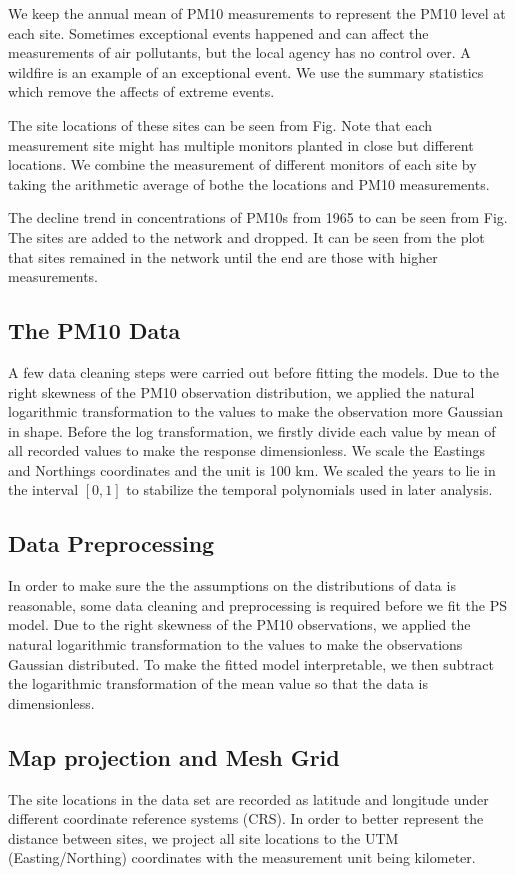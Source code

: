 We keep the annual mean of PM10 measurements to represent the PM10 level at each site.
Sometimes exceptional events happened and can affect the measurements of air pollutants, 
but the local agency has no control over. A wildfire is an example of an exceptional event. 
We use the summary statistics which remove the affects of extreme events.  

The site locations of these sites can be seen from Fig. Note that each measurement site might has 
multiple monitors planted in close but different locations. We combine the measurement of different
monitors of each site by taking the arithmetic average of bothe the locations and PM10 measurements.

The decline trend in concentrations of PM10s from 1965 to can be seen from Fig. The sites are added 
to the network and dropped. It can be seen from the plot that sites remained in the network until 
the end are those with higher measurements.
\subsection{The PM10 Data}
A few data cleaning steps were carried out before fitting the models. Due to the right skewness of 
the PM10 observation distribution, we applied the natural logarithmic transformation to the values
to make the observation more Gaussian in shape. Before the log transformation, we firstly divide
each value by mean of all recorded values to make the response dimensionless.
We scale the Eastings and Northings coordinates and the unit is 100 km. We scaled the years to
lie in the interval $[0, 1]$ to stabilize the temporal polynomials used in later analysis.

\subsection{Data Preprocessing}
In order to make sure the the assumptions on the distributions of data is reasonable, some data
cleaning and preprocessing is required before we fit the PS model. Due to the right skewness of the
PM10 observations, we applied the natural logarithmic transformation to the values to make the 
observations Gaussian distributed. To make the fitted model interpretable, we then subtract the 
logarithmic transformation of the mean value so that the data is dimensionless. 

\subsection{Map projection and Mesh Grid}
The site locations in the data set are recorded as latitude and longitude under different coordinate
reference systems (CRS). In order to better represent the distance between sites, we project all 
site locations to the UTM (Easting/Northing) coordinates with the measurement unit being kilometer.

